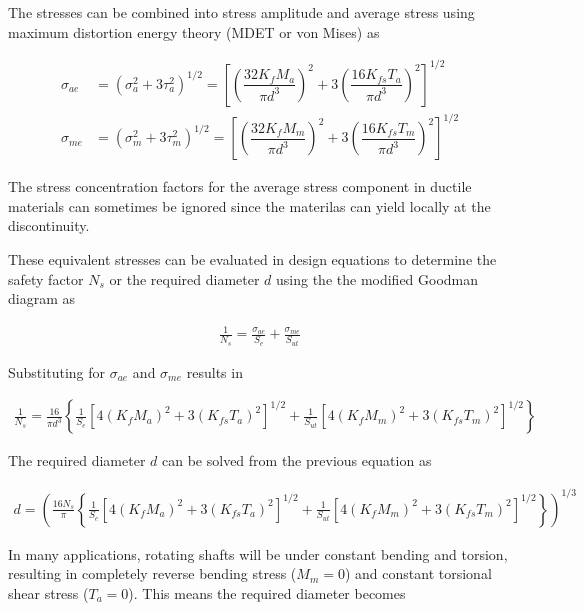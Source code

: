 \documentclass[a4paper,openany]{tufte-book}
\begin{document}
The stresses can be combined into stress amplitude and average stress
using maximum distortion energy theory (MDET or von Mises) as

\begin{align}
  \label{eq: von mises shaft stress}
  \sigma_{ae} &= \left( \sigma_a^2 + 3\tau_a^2 \right)^{1/2} = \left[ \left( \dfrac{32 K_fM_a}{\pi d^3} \right)^2 + 3\left( \dfrac{16 K_{fs} T_a}{\pi d^3} \right)^2 \right]^{1/2} \\
  \sigma_{me} &= \left( \sigma_m^2 + 3\tau_m^2 \right)^{1/2} = \left[ \left( \dfrac{32 K_fM_m}{\pi d^3} \right)^2 + 3\left( \dfrac{16 K_{fs} T_m}{\pi d^3} \right)^2 \right]^{1/2}
\end{align}

The stress concentration factors for the average stress component in
ductile materials can sometimes be ignored since the materilas can yield
locally at the discontinuity.

These equivalent stresses can be evaluated in design equations to
determine the safety factor \(N_s\) or the required diameter \(d\) using
the the modified Goodman diagram as

\begin{align}
  \frac{1}{N_s} = \frac{\sigma_{ae}}{S_e} + \frac{\sigma_{me}}{S_{ut}}
\end{align}

Substituting for \(\sigma_{ae}\) and \(\sigma_{me}\) results in

\begin{align}
  \frac{1}{N_s} = \frac{16}{\pi d^3} \left\{ \frac{1}{S_e} \left[ 4 \left( K_f M_a \right)^2 + 3 \left( K_{fs} T_a \right)^2 \right]^{1/2} + \frac{1}{S_{ut}} \left[ 4 \left( K_f M_m \right)^2 + 3 \left( K_{fs} T_m \right)^2 \right]^{1/2} \right\}
\end{align}

The required diameter \(d\) can be solved from the previous equation as

\begin{align}
  d = \left( \frac{16N_s}{\pi} \left\{ \frac{1}{S_e} \left[ 4 \left( K_f M_a \right)^2 + 3 \left( K_{fs} T_a \right)^2 \right]^{1/2} + \frac{1}{S_{ut}} \left[ 4 \left( K_f M_m \right)^2 + 3 \left( K_{fs} T_m \right)^2 \right]^{1/2} \right\} \right)^{1/3}
\end{align}

In many applications, rotating shafts will be under constant bending and
torsion, resulting in completely reverse bending stress (\(M_m = 0\))
and constant torsional shear stress (\(T_a = 0\)). This means the
required diameter becomes
\end{document}
